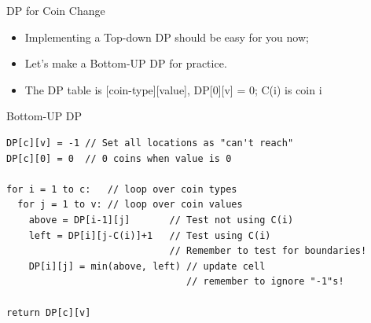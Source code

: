 \begin{frame}[fragile]{DP for Coin Change}
  \begin{itemize}
    \item Implementing a Top-down DP should be easy for you now;
    \item Let's make a Bottom-UP DP for practice.
    \item The DP table is [coin-type][value], DP[0][v] = 0; C(i) is coin i
  \end{itemize}

\begin{block}{Bottom-UP DP}
  {\smaller
\begin{verbatim}
DP[c][v] = -1 // Set all locations as "can't reach"
DP[c][0] = 0  // 0 coins when value is 0

for i = 1 to c:   // loop over coin types
  for j = 1 to v: // loop over coin values
    above = DP[i-1][j]       // Test not using C(i)
    left = DP[i][j-C(i)]+1   // Test using C(i)
                             // Remember to test for boundaries!
    DP[i][j] = min(above, left) // update cell
                                // remember to ignore "-1"s!

return DP[c][v]  
\end{verbatim}}
\end{block}
\end{frame}

